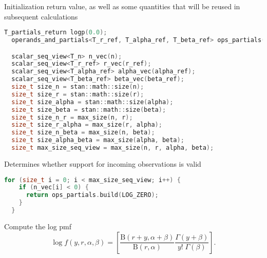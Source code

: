 \documentclass[11pt]{article}
\begin{document}
Initialization return value, as well as some quantities that will be reused in subsequent calculations
\begin{lstlisting}[language=c++, style=lgeneral]
  T_partials_return logp(0.0);
  operands_and_partials<T_r_ref, T_alpha_ref, T_beta_ref> ops_partials(r_ref, alpha_ref, beta_ref);

  scalar_seq_view<T_n> n_vec(n);
  scalar_seq_view<T_r_ref> r_vec(r_ref);
  scalar_seq_view<T_alpha_ref> alpha_vec(alpha_ref);
  scalar_seq_view<T_beta_ref> beta_vec(beta_ref);
  size_t size_n = stan::math::size(n);
  size_t size_r = stan::math::size(r);
  size_t size_alpha = stan::math::size(alpha);
  size_t size_beta = stan::math::size(beta);
  size_t size_n_r = max_size(n, r);
  size_t size_r_alpha = max_size(r, alpha);
  size_t size_n_beta = max_size(n, beta);
  size_t size_alpha_beta = max_size(alpha, beta);
  size_t max_size_seq_view = max_size(n, r, alpha, beta);
\end{lstlisting}


Determines whether support for incoming observations is valid
\begin{lstlisting}[language=c++, style=lgeneral]
  for (size_t i = 0; i < max_size_seq_view; i++) {
    if (n_vec[i] < 0) {
      return ops_partials.build(LOG_ZERO);
    }
  }
\end{lstlisting}

Compute the log pmf
\begin{equation}
  \log f(y, r, \alpha ,\beta)= \left[ \frac {\mathrm {B} (r+y,\alpha +\beta )}{\mathrm {B} (r,\alpha )} \frac {\Gamma (y+\beta )}{y!\;\Gamma (\beta )} \right].
\end{equation}
\end{document}
